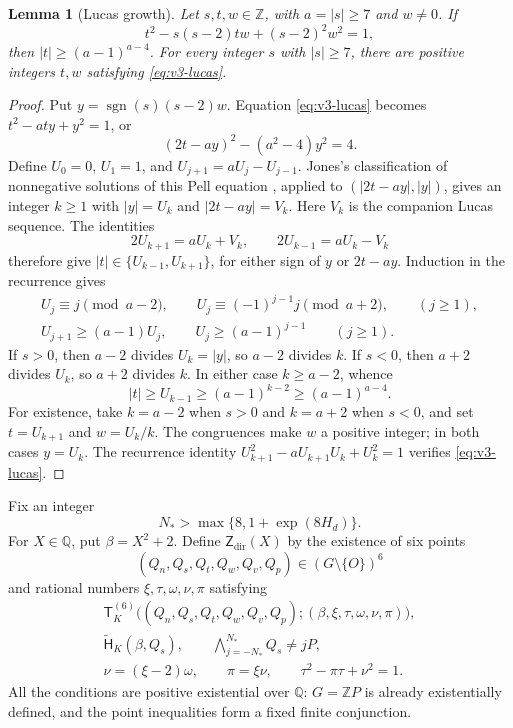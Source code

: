 \documentclass[11pt]{article}
\newtheorem{lemma}[theorem]{Lemma}
\theoremstyle{definition}\newtheorem{inputthm}[theorem]{Hypothesis}
\theoremstyle{remark}\newtheorem{remark}[theorem]{Remark}
\newcommand{\Q}{\mathbb Q}\newcommand{\Z}{\mathbb Z}
\begin{document}
\begin{lemma}[Lucas growth]\label{lem:v3-lucas}
Let $s,t,w\in\Z$, with $a=|s|\ge7$ and $w\ne0$. If
\begin{equation}\label{eq:v3-lucas}
                 t^2-s(s-2)tw+(s-2)^2w^2=1,
\end{equation}
then $|t|\ge(a-1)^{a-4}$. For every integer $s$ with $|s|\ge7$,
there are positive integers $t,w$ satisfying \eqref{eq:v3-lucas}.
\end{lemma}
\begin{proof}
Put $y=\operatorname{sgn}(s)(s-2)w$. Equation
\eqref{eq:v3-lucas} becomes $t^2-aty+y^2=1$, or
\[
                       (2t-ay)^2-(a^2-4)y^2=4.
\]
Define $U_0=0$, $U_1=1$, and $U_{j+1}=aU_j-U_{j-1}$.
Jones's classification of nonnegative solutions of this Pell equation
\cite[Corollary~2.7]{JonesLucas2003}, applied to
$(|2t-ay|,|y|)$, gives an integer $k\ge1$ with
$|y|=U_k$ and $|2t-ay|=V_k$. Here $V_k$ is the companion Lucas
sequence. The identities
\[
                   2U_{k+1}=aU_k+V_k,\qquad
                   2U_{k-1}=aU_k-V_k
\]
\cite[(5)--(6)]{JonesLucas2003} therefore give
$|t|\in\{U_{k-1},U_{k+1}\}$, for either sign of $y$ or $2t-ay$.
Induction in the recurrence gives
\[
 \begin{gathered}
 U_j\equiv j\pmod{a-2},\qquad
 U_j\equiv(-1)^{j-1}j\pmod{a+2},\qquad(j\ge1),\\
 U_{j+1}\ge(a-1)U_j,\qquad
 U_j\ge(a-1)^{j-1}\qquad(j\ge1).
 \end{gathered}
\]
If $s>0$, then $a-2$ divides $U_k=|y|$, so $a-2$ divides $k$.
If $s<0$, then $a+2$ divides $U_k$, so $a+2$ divides $k$.
In either case $k\ge a-2$, whence
\[
                  |t|\ge U_{k-1}\ge(a-1)^{k-2}
                       \ge(a-1)^{a-4}.
\]
For existence, take $k=a-2$ when $s>0$ and $k=a+2$ when $s<0$,
and set $t=U_{k+1}$ and $w=U_k/k$. The congruences make $w$ a
positive integer; in both cases $y=U_k$. The recurrence identity
$U_{k+1}^2-aU_{k+1}U_k+U_k^2=1$ verifies
\eqref{eq:v3-lucas}.
\end{proof}

Fix an integer
\[
                    N_*>\max\{8,1+\exp(8H_d)\}.
\]
For $X\in\Q$, put $\beta=X^2+2$. Define
$\mathsf Z_{\mathrm{dir}}(X)$ by the existence of six points
\[
              (Q_n,Q_s,Q_t,Q_w,Q_v,Q_p)\in(G\setminus\{O\})^6
\]
and rational numbers $\xi,\tau,\omega,\nu,\pi$ satisfying
\begin{equation}\label{eq:v3-direct-certificate}
 \begin{gathered}
 \mathsf T_K^{(6)}\bigl((Q_n,Q_s,Q_t,Q_w,Q_v,Q_p);
                         (\beta,\xi,\tau,\omega,\nu,\pi)\bigr),\\
 \widetilde{\mathsf H}_K(\beta,Q_s),\qquad
                         \bigwedge_{j=-N_*}^{N_*}Q_s\ne jP,\\
 \nu=(\xi-2)\omega,\qquad \pi=\xi\nu,\qquad
                         \tau^2-\pi\tau+\nu^2=1.
 \end{gathered}
\end{equation}
All the conditions are positive existential over $\Q$: $G=\Z P$
is already existentially defined, and the point inequalities form a
fixed finite conjunction.
\end{document}
